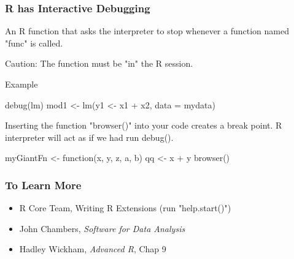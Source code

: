 \documentclass[10pt,english]{beamer}
\begin{document}
\begin{frame}
  \frametitle{R has Interactive Debugging}
  \begin{description}
  \item [debug(func)] An R function that asks the interpreter to stop
    whenever a function named "func" is called. 
    
  \item Caution: The function must be "in" the R session.
    
   \item Example
\begin{Schunk}
\begin{Sinput}
debug(lm)
mod1 <- lm(y1 <- x1 + x2, data = mydata)
\end{Sinput}
\end{Schunk}
   
   \item [browser()] Inserting the function "browser()" into your code creates a
      break point. R interpreter will act as if we had run debug().
      
\begin{Schunk}
\begin{Sinput}
myGiantFn <- function(x, y, z, a, b){
  qq <- x + y
  browser()
  }
\end{Sinput}
\end{Schunk}    
      
      
    \end{description}
\end{frame}


\begin{frame}[containsverbatim]
  \frametitle{To Learn More}  
  \begin{itemize}
  \item  R Core Team, Writing R Extensions (run "help.start()")
  \item  John Chambers, \emph{Software for Data Analysis}
  \item  Hadley Wickham, \emph{Advanced R}, Chap 9
  \end{itemize}
\end{frame}
\end{document}
